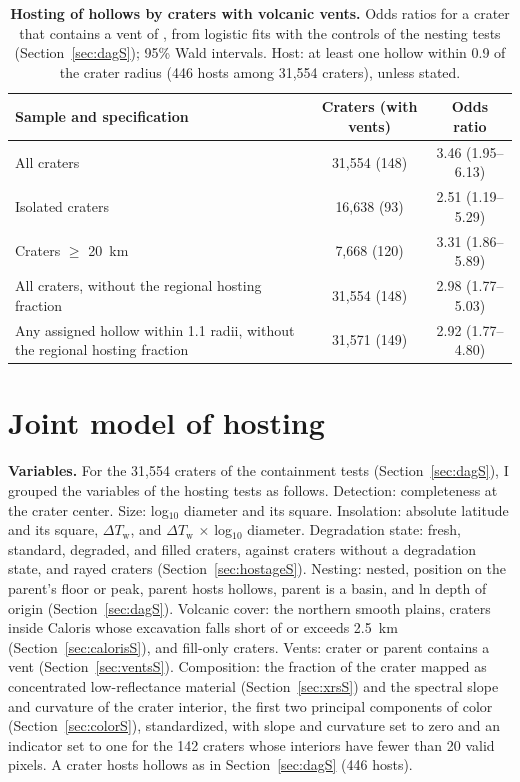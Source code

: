 \documentclass{planetary}
\begin{document}
\begin{table}[!ht]
    \mytablestyle
    \caption{{\bf Hosting of hollows by craters with volcanic vents.} Odds ratios for a crater that contains a vent of \textcite{pegg2021}, from logistic fits with the controls of the nesting tests (Section~\ref{sec:dagS}); 95\% Wald intervals. Host: at least one hollow within 0.9 of the crater radius (446 hosts among 31,554 craters), unless stated.}
    \footnotesize{
        \begin{tabularx}{\textwidth}{>{\raggedright\arraybackslash}X c c}
            \toprule
            \textbf{Sample and specification} & \textbf{Craters (with vents)} & \textbf{Odds ratio} \\
            \hline
            All craters & 31,554 (148) & 3.46 (1.95--6.13) \\
            Isolated craters & 16,638 (93) & 2.51 (1.19--5.29) \\
            Craters $\geq$ 20~km & 7,668 (120) & 3.31 (1.86--5.89) \\
            All craters, without the regional hosting fraction & 31,554 (148) & 2.98 (1.77--5.03) \\
            Any assigned hollow within 1.1 radii, without the regional hosting fraction & 31,571 (149) & 2.92 (1.77--4.80) \\
            \hline
        \end{tabularx}}
    \label{tab:vents}
\end{table}

\clearpage

\section{Joint model of hosting}
\label{sec:jointS}

\textbf{Variables.} For the 31,554 craters of the containment tests (Section~\ref{sec:dagS}), I grouped the variables of the hosting tests as follows. Detection: completeness at the crater center. Size: log$_{10}$ diameter and its square. Insolation: absolute latitude and its square, $\Delta T_\mathrm{w}$, and $\Delta T_\mathrm{w}$ $\times$ log$_{10}$ diameter. Degradation state: fresh, standard, degraded, and filled craters, against craters without a degradation state, and rayed craters (Section~\ref{sec:hostageS}). Nesting: nested, position on the parent's floor or peak, parent hosts hollows, parent is a basin, and ln depth of origin (Section~\ref{sec:dagS}). Volcanic cover: the northern smooth plains, craters inside Caloris whose excavation falls short of or exceeds 2.5~km (Section~\ref{sec:calorisS}), and fill-only craters. Vents: crater or parent contains a vent (Section~\ref{sec:ventsS}). Composition: the fraction of the crater mapped as concentrated low-reflectance material (Section~\ref{sec:xrsS}) and the spectral slope and curvature of the crater interior, the first two principal components of color (Section~\ref{sec:colorS}), standardized, with slope and curvature set to zero and an indicator set to one for the 142 craters whose interiors have fewer than 20 valid pixels. A crater hosts hollows as in Section~\ref{sec:dagS} (446 hosts).
\end{document}
